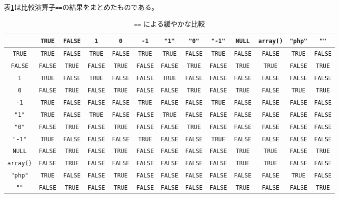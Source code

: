 表\ref{compare==}は比較演算子\texttt{==}の結果をまとめたものである。
\begin{table}\setlength{\tabcolsep}{0.2em}
\caption{\protect\texttt{==} による緩やかな比較}\label{compare==}
\begin{center}
  \begin{tabular}{|*{13}{c|}}\hline
 &\verb+TRUE+&\verb+FALSE+&\verb+1+&\verb+0+&\verb+-1+&\verb+"1"+&\verb+"0"+&\verb+"-1"+&\verb+NULL+&\verb+array()+&\verb+"php"+&\verb+""+\\\hline
\verb+TRUE+&\verb+TRUE+&\verb+FALSE+&\verb+TRUE+&\verb+FALSE+&\verb+TRUE+&\verb+TRUE+&\verb+FALSE+&\verb+TRUE+&\verb+FALSE+&\verb+FALSE+&\verb+TRUE+&\verb+FALSE+\\\hline
\verb+FALSE+&\verb+FALSE+&\verb+TRUE+&\verb+FALSE+&\verb+TRUE+&\verb+FALSE+&\verb+FALSE+&\verb+TRUE+&\verb+FALSE+&\verb+TRUE+&\verb+TRUE+&\verb+FALSE+&\verb+TRUE+\\\hline
\verb+1+&\verb+TRUE+&\verb+FALSE+&\verb+TRUE+&\verb+FALSE+&\verb+FALSE+&\verb+TRUE+&\verb+FALSE+&\verb+FALSE+&\verb+FALSE+&\verb+FALSE+&\verb+FALSE+&\verb+FALSE+\\\hline
\verb+0+&\verb+FALSE+&\verb+TRUE+&\verb+FALSE+&\verb+TRUE+&\verb+FALSE+&\verb+FALSE+&\verb+TRUE+&\verb+FALSE+&\verb+TRUE+&\verb+FALSE+&\verb+TRUE+&\verb+TRUE+\\\hline
\verb+-1+&\verb+TRUE+&\verb+FALSE+&\verb+FALSE+&\verb+FALSE+&\verb+TRUE+&\verb+FALSE+&\verb+FALSE+&\verb+TRUE+&\verb+FALSE+&\verb+FALSE+&\verb+FALSE+&\verb+FALSE+\\\hline
\verb+"1"+&\verb+TRUE+&\verb+FALSE+&\verb+TRUE+&\verb+FALSE+&\verb+FALSE+&\verb+TRUE+&\verb+FALSE+&\verb+FALSE+&\verb+FALSE+&\verb+FALSE+&\verb+FALSE+&\verb+FALSE+\\\hline
\verb+"0"+&\verb+FALSE+&\verb+TRUE+&\verb+FALSE+&\verb+TRUE+&\verb+FALSE+&\verb+FALSE+&\verb+TRUE+&\verb+FALSE+&\verb+FALSE+&\verb+FALSE+&\verb+FALSE+&\verb+FALSE+\\\hline
\verb+"-1"+&\verb+TRUE+&\verb+FALSE+&\verb+FALSE+&\verb+FALSE+&\verb+TRUE+&\verb+FALSE+&\verb+FALSE+&\verb+TRUE+&\verb+FALSE+&\verb+FALSE+&\verb+FALSE+&\verb+FALSE+\\\hline
\verb+NULL+&\verb+FALSE+&\verb+TRUE+&\verb+FALSE+&\verb+TRUE+&\verb+FALSE+&\verb+FALSE+&\verb+FALSE+&\verb+FALSE+&\verb+TRUE+&\verb+TRUE+&\verb+FALSE+&\verb+TRUE+\\\hline
\verb+array()+&\verb+FALSE+&\verb+TRUE+&\verb+FALSE+&\verb+FALSE+&\verb+FALSE+&\verb+FALSE+&\verb+FALSE+&\verb+FALSE+&\verb+TRUE+&\verb+TRUE+&\verb+FALSE+&\verb+FALSE+\\\hline
\verb+"php"+&\verb+TRUE+&\verb+FALSE+&\verb+FALSE+&\verb+TRUE+&\verb+FALSE+&\verb+FALSE+&\verb+FALSE+&\verb+FALSE+&\verb+FALSE+&\verb+FALSE+&\verb+TRUE+&\verb+FALSE+\\\hline
\verb+""+&\verb+FALSE+&\verb+TRUE+&\verb+FALSE+&\verb+TRUE+&\verb+FALSE+&\verb+FALSE+&\verb+FALSE+&\verb+FALSE+&\verb+TRUE+&\verb+FALSE+&\verb+FALSE+&\verb+TRUE+\\\hline
  \end{tabular}
\end{center}
\end{table}
